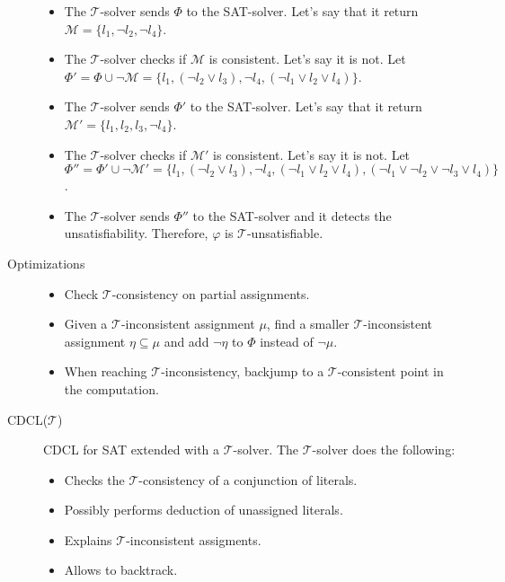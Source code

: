 \begin{description}
\begin{example}
\begin{itemize}
                \item The $\mathcal{T}$-solver sends $\Phi$ to the SAT-solver.
                    Let's say that it return $\mathcal{M} = \{ l_1, \lnot l_2, \lnot l_4 \}$.

                \item The $\mathcal{T}$-solver checks if $\mathcal{M}$ is consistent. Let's say it is not.
                    Let $\Phi' = \Phi \cup \lnot \mathcal{M} = \{ l_1, (\lnot l_2 \vee l_3), \lnot l_4, (\lnot l_1 \vee l_2 \vee l_4) \}$.
                
                \item The $\mathcal{T}$-solver sends $\Phi'$ to the SAT-solver.
                    Let's say that it return $\mathcal{M}' = \{ l_1, l_2, l_3, \lnot l_4 \}$.

                \item The $\mathcal{T}$-solver checks if $\mathcal{M}'$ is consistent. Let's say it is not.
                    Let $\Phi'' = \Phi' \cup \lnot \mathcal{M}' = \{ l_1, (\lnot l_2 \vee l_3), \lnot l_4, (\lnot l_1 \vee l_2 \vee l_4), (\lnot l_1 \vee \lnot l_2 \vee \lnot l_3 \vee l_4) \}$.
                
                \item The $\mathcal{T}$-solver sends $\Phi''$ to the SAT-solver and it detects the unsatisfiability.
                    Therefore, $\varphi$ is $\mathcal{T}$-unsatisfiable.
            \end{itemize}
        \end{example}

    \item[Optimizations] \phantom{}
        \begin{itemize}
            \item Check $\mathcal{T}$-consistency on partial assignments.
            \item Given a $\mathcal{T}$-inconsistent assignment $\mu$, 
                find a smaller $\mathcal{T}$-inconsistent assignment $\eta \subseteq \mu$ and add $\lnot \eta$ to $\Phi$ instead of $\lnot \mu$.
            \item When reaching $\mathcal{T}$-inconsistency, backjump to a $\mathcal{T}$-consistent point in the computation.
        \end{itemize}

    \item[CDCL($\mathcal{T}$)] 
        CDCL for SAT extended with a $\mathcal{T}$-solver.
        The $\mathcal{T}$-solver does the following:
        \begin{itemize}
            \item Checks the $\mathcal{T}$-consistency of a conjunction of literals.
            \item Possibly performs deduction of unassigned literals.
            \item Explains $\mathcal{T}$-inconsistent assigments.
            \item Allows to backtrack.
        \end{itemize}
\end{description}
